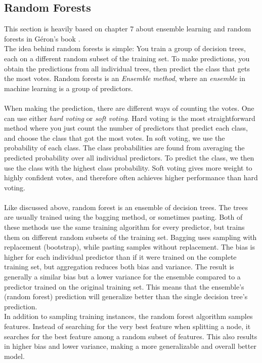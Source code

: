\documentclass[12pt]{article}
\numberwithin{figure}{section}
\begin{document}
\subsection{Random Forests}
This section is heavily based on chapter 7 about ensemble learning and random forests in Géron's book \cite{Geron}.\\
The idea behind random forests is simple: You train a group of decision trees, each on a different random subset of the training set. To make predictions, you obtain the predictions from all individual trees, then predict the class that gets the most votes. Random forests is an \textit{Ensemble method}, where an \textit{ensemble} in machine learning is  a group of predictors.\\ \\
When making the prediction, there are different ways of counting the votes. One can use either \textit{hard voting} or \textit{soft voting}. Hard voting is the most straightforward method where you just count the number of predictors that predict each class, and choose the class that got the most votes. In soft voting, we use the probability of each class. The class probabilities are found from averaging the predicted probability over all individual predictors. To predict the class, we then use the class with the highest class probability. Soft voting gives more weight to highly confident votes, and therefore often achieves higher performance than hard voting.\\ \\
Like discussed above, random forest is an ensemble of decision trees. The trees are usually trained using the bagging method, or sometimes pasting. Both of these methods use the same training algorithm for every predictor, but trains them on different random subsets of the training set. Bagging uses sampling with replacement (bootstrap), while pasting samples without replacement. The bias is higher for each individual predictor than if it were trained on the complete training set, but aggregation reduces both bias and variance. The result is generally a similar bias but a lower variance for the ensemble compared to a predictor trained on the original training set. This means that the ensemble's (random forest) prediction will generalize better than the single decision tree's prediction.\\
In addition to sampling training instances, the random forest algorithm samples features. Instead of searching for the very best feature when splitting a node, it searches for the best feature among a random subset of features. This also results in higher bias and lower variance, making a more generalizable and overall better model.\\ \\
\end{document}
